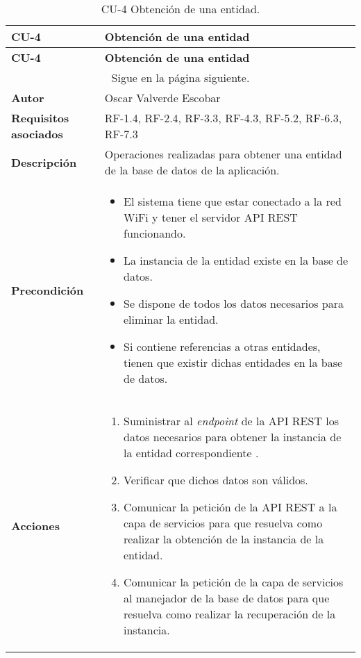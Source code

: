 \begin{longtable}{ p{} p{} }
    \caption{CU-4 Obtención de una entidad.}\\
    \hline
    \textbf{CU-4}    & \textbf{Obtención de una entidad}\\
    \hline
    \endfirsthead
    \hline
    \textbf{CU-4}    & \textbf{Obtención de una entidad}\\
    \hline
    \endhead
        \hline
        \multicolumn{2}{c}{Sigue en la página siguiente.}
        \endfoot
        \hline
        \endlastfoot
        
    \textbf{Versión}              & 1.0    \\
    \textbf{Autor}                & Oscar Valverde Escobar \\
    \textbf{Requisitos asociados} & RF-1.4, RF-2.4, RF-3.3, RF-4.3, RF-5.2, RF-6.3, RF-7.3\\
    \textbf{Descripción}          & Operaciones realizadas para obtener una entidad de la base de datos de la aplicación.\\
    \textbf{Precondición}         & 
        \begin{itemize}
            \item El sistema tiene que estar conectado a la red WiFi y tener el servidor API REST funcionando. 
            \item La instancia de la entidad existe en la base de datos. 
            \item Se dispone de todos los datos necesarios para eliminar la entidad.
            \item Si contiene referencias a otras entidades, tienen que existir dichas entidades en la base de datos.
        \end{itemize}\\
    \textbf{Acciones}             &
    \begin{enumerate}
        \def\labelenumi{\arabic{enumi}.}
        \tightlist
        \item Suministrar al \textit{endpoint} de la API REST los datos necesarios para obtener la instancia de la entidad correspondiente .
        \item Verificar que dichos datos son válidos.
        \item Comunicar la petición de la API REST a la capa de servicios para que resuelva como realizar la obtención de la instancia de la entidad.
        \item Comunicar la petición de la capa de servicios al manejador de la base de datos para que resuelva como realizar la recuperación de la instancia.

\end{enumerate}
\end{longtable}
